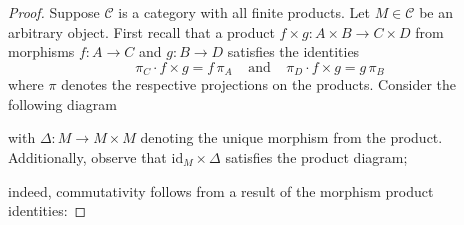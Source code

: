 \documentclass[ 12pt ]{article}
\begin{document}
\begin{enumerate}
		\begin{proof}
			Suppose $\mathscr{C}$ is a category with all finite products. Let $M \in \mathscr{C}$ be an arbitrary object. First recall that a product $f \times g : A \times B \to C \times D$ from morphisms $f : A \to C$ and $g : B \to D$ satisfies the identities $$\pi_C \cdot f \times g = f\, \pi_A\;\;\;\; \mathrm{and}\;\;\;\; \pi_D \cdot f \times g = g\, \pi_B$$ where $\pi$ denotes the respective projections on the products. Consider the following diagram
			\begin{center}
			\end{center}
			with $\Delta : M \to M \times M$ denoting the unique morphism from the product. Additionally, observe that $\mathrm{id}_M \times \Delta$ satisfies the product diagram;
			\begin{center}
			\end{center}
			indeed, commutativity follows from a result of the morphism product identities:

\end{proof}
\end{enumerate}
\end{document}
